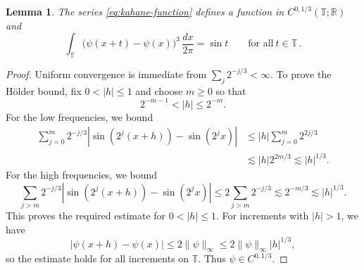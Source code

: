 \documentclass[11pt]{amsart}
\newtheorem{lemma}[theorem]{Lemma}
\theoremstyle{definition}
\theoremstyle{remark}
\newcommand{\T}{\mathbb T}
\newcommand{\R}{\mathbb R}
\begin{document}
\begin{lemma}\label{lem:kahane}
The series \eqref{eq:kahane-function} defines a function in $C^{0,1/3}(\T;\R)$ and
\begin{equation}\label{eq:kahane-identity}
 \int_\T
 \big(\psi(x+t)-\psi(x)\big)^3\,\frac{dx}{2\pi}
 =\sin t
 \qquad\text{for all}\ t\in\T \,.
\end{equation}
\end{lemma}

\begin{proof}
Uniform convergence is immediate from $\sum_j2^{-j/3}<\infty$.  To prove the H\"older bound, fix $0<|h|\leq1$ and choose $m\geq0$ so that
\[
 2^{-m-1}<|h|\leq2^{-m}.
\]
For the low frequencies, we bound
\begin{align*}
 \sum_{j=0}^m2^{-j/3}
 |\sin(2^j(x+h))-\sin(2^j x)|
 &\leq |h|\sum_{j=0}^m2^{2j/3}\\
 &\lesssim |h|2^{2m/3}
 \lesssim |h|^{1/3}.
\end{align*}
For the high frequencies, we bound
\[
 \sum_{j>m}2^{-j/3}
 |\sin(2^j(x+h))-\sin(2^j x)|
 \leq2\sum_{j>m}2^{-j/3}
 \lesssim 2^{-m/3}
 \lesssim |h|^{1/3}.
\]
This proves the required estimate for $0<|h|\leq1$. For increments with
$|h|>1$, we have
\[
 |\psi(x+h)-\psi(x)|
 \leq2\|\psi\|_\infty
 \leq2\|\psi\|_\infty |h|^{1/3},
\]
so the estimate holds for all increments on $\T$. Thus
$\psi\in C^{0,1/3}$.


\end{proof}
\end{document}
